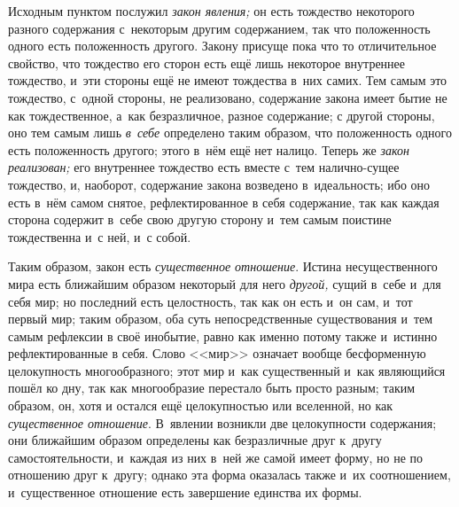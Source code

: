 Исходным пунктом послужил {\em закон явления;} он есть
тождество некоторого разного содержания с~некоторым другим содержанием, так
что положенность одного есть положенность другого. Закону присуще пока что
то отличительное свойство, что тождество его сторон есть ещё лишь некоторое
внутреннее тождество, и~эти стороны ещё не имеют тождества в~них самих. Тем
самым это тождество, с~одной стороны, не реализовано, содержание закона
имеет бытие не как тождественное, а~как безразличное, разное содержание; с
другой стороны, оно тем самым лишь {\em в~себе}
определено таким образом, что положенность одного есть положенность
другого; этого в~нём ещё нет налицо. Теперь же
{\em закон реализован;} его внутреннее тождество есть
вместе с~тем налично-сущее тождество, и, наоборот, содержание закона
возведено в~идеальность; ибо оно есть в~нём самом снятое, рефлектированное
в себя содержание, так как каждая сторона содержит в~себе свою другую
сторону и~тем самым поистине тождественна и~с ней, и~с собой.

Таким образом, закон есть {\em существенное отношение}.
Истина несущественного мира есть ближайшим образом некоторый для него
{\em другой,} сущий в~себе и~для себя мир; но последний
есть целостность, так как он есть и~он сам, и~тот первый мир; таким
образом, оба суть непосредственные существования и~тем самым рефлексии в
своё инобытие, равно как именно потому также и~истинно рефлектированные в
себя. Слово <<мир>> означает вообще бесформенную целокупность многообразного;
этот мир и~как существенный и~как являющийся пошёл ко дну, так как
многообразие перестало быть просто разным; таким образом, он, хотя и
остался ещё целокупностью или вселенной, но как
{\em существенное отношение}. В~явлении возникли две
целокупности содержания; они ближайшим образом определены как безразличные
друг к~другу самостоятельности, и~каждая из них в~ней же самой имеет форму,
но не по отношению друг к~другу; однако эта форма оказалась также и~их
соотношением, и~существенное отношение есть завершение единства их формы.

